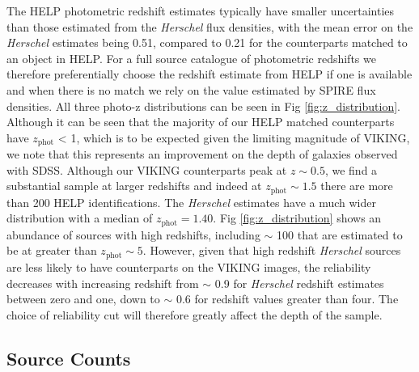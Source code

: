 \documentclass[fleqn,usenatbib]{mnras}
\begin{document}
The HELP photometric redshift estimates typically have smaller uncertainties than those estimated from the \textit{Herschel} flux densities, with the mean error on the \textit{Herschel} estimates being 0.51, compared to 0.21 for the counterparts matched to an object in HELP. For a full source catalogue of photometric redshifts we therefore preferentially choose the redshift estimate from HELP if one is available and when there is no match we rely on the value estimated by SPIRE flux densities. All three photo-z distributions can be seen in Fig \ref{fig:z_distribution}. Although it can be seen that the majority of our HELP matched counterparts have $z_{\textrm{phot}}$ < 1, which is to be expected given the limiting magnitude of VIKING, we note that this represents an improvement on the depth of galaxies observed with SDSS. Although our VIKING counterparts peak at $z \sim 0.5$, we find a substantial sample at larger redshifts and indeed at $z_{\textrm{phot}} \sim 1.5$ there are more than 200 HELP identifications. The \textit{Herschel} estimates have a much wider distribution with a median of $z_{\textrm{phot}} = 1.40$. Fig \ref{fig:z_distribution} shows an abundance of sources with high redshifts, including $\sim$ 100 that are estimated to be at greater than $z_{\textrm{phot}} \sim 5$. However, given that high redshift \textit{Herschel} sources are less likely to have counterparts on the VIKING images, the reliability decreases with increasing redshift from $\sim$ 0.9 for \textit{Herschel} redshift estimates between zero and one, down to $\sim$ 0.6 for redshift values greater than four. The choice of reliability cut will therefore greatly affect the depth of the sample.

\subsection{Source Counts}
\label{sec:source_counts}
\end{document}
